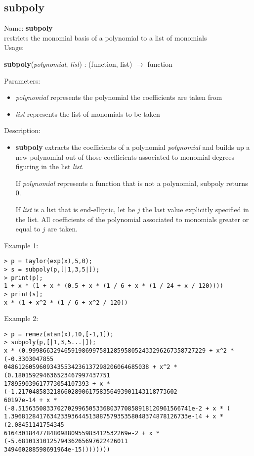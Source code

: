 \subsection{subpoly}
\label{labsubpoly}
\noindent Name: \textbf{subpoly}\\
restricts the monomial basis of a polynomial to a list of monomials\\
\noindent Usage: 
\begin{center}
\textbf{subpoly}(\emph{polynomial}, \emph{list}) : (\textsf{function}, \textsf{list}) $\rightarrow$ \textsf{function}\\
\end{center}
Parameters: 
\begin{itemize}
\item \emph{polynomial} represents the polynomial the coefficients are taken from
\item \emph{list} represents the list of monomials to be taken
\end{itemize}
\noindent Description: \begin{itemize}

\item \textbf{subpoly} extracts the coefficients of a polynomial \emph{polynomial} and builds up a
   new polynomial out of those coefficients associated to monomial degrees figuring in
   the list \emph{list}. 
    
   If \emph{polynomial} represents a function that is not a polynomial, subpoly returns 0.
    
   If \emph{list} is a list that is end-elliptic, let be $j$ the last value explicitly specified
   in the list. All coefficients of the polynomial associated to monomials greater or
   equal to $j$ are taken.
\end{itemize}
\noindent Example 1: 
\begin{center}\begin{minipage}{15cm}\begin{Verbatim}[frame=single]
> p = taylor(exp(x),5,0);
> s = subpoly(p,[|1,3,5|]);
> print(p);
1 + x * (1 + x * (0.5 + x * (1 / 6 + x * (1 / 24 + x / 120))))
> print(s);
x * (1 + x^2 * (1 / 6 + x^2 / 120))
\end{Verbatim}
\end{minipage}\end{center}
\noindent Example 2: 
\begin{center}\begin{minipage}{15cm}\begin{Verbatim}[frame=single]
> p = remez(atan(x),10,[-1,1]);
> subpoly(p,[|1,3,5...|]);
x * (0.99986632946591986997581285958052433296267358727229 + x^2 * (-0.3303047855
04861260596093435534236137298206064685038 + x^2 * (0.180159294636523467997437751
178959039617773054107393 + x * (-1.217048583218660289061758356493901143118773602
60197e-14 + x * (-8.5156350833702702996505336803770858918120961566741e-2 + x * (
1.39681284176342339364451388757935358048374878126733e-14 + x * (2.08451141754345
61643018447784809880955983412532269e-2 + x * (-5.6810131012579436265697622426011
349460288598691964e-15))))))))
\end{Verbatim}
\end{minipage}\end{center}

